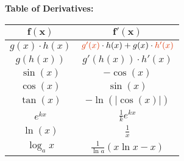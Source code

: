\begin{tcolorbox}[colback=blue!5!white,colframe=blue!75!black,title=\textbf{Introduction}]
\textbf{Table of Derivatives:}
\begin{center}
\begin{tabular}{|c|c|}
	\hline 
	\textbf{$\mathbf{f(x)}$} & \textbf{$\mathbf{f'(x)}$} \\ 
	\hline 
	$ g(x) \cdot h(x)$& ${\color{red}g'(x)} \cdot h(x) + g(x) \cdot {\color{red}h'(x)}$ \\ 
	\hline 
	$ g(h(x))$ & $g'(h(x)) \cdot h'(x)$ \\ 
	\hline 
	$\sin(x)$ & $-\cos(x)$ \\ 
	\hline 
	$\cos(x)$ & $\sin(x)$ \\ 
	\hline 
	$\tan(x)$& $-\ln(\vert\cos(x)\vert)$ \\ %
	\hline 
	$e^{kx}$& $\frac{1}{k}e^{kx} $\\ 
	\hline 
	$\ln(x)$& $\frac{1}{x}$ \\ 
	\hline 
	$\log_ax$& $\frac{1}{\ln a}(x\ln x -x)$ \\ 
	\hline 
\end{tabular} 
\end{center}
\end{tcolorbox}